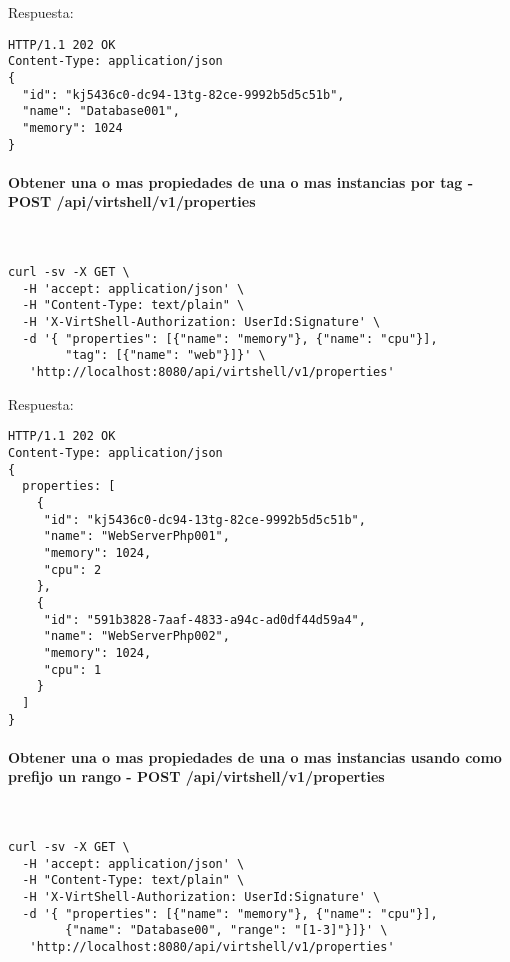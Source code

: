 \vspace{1cm}
Respuesta:
\vspace{1cm}

\begin{lstlisting}[style=json]
HTTP/1.1 202 OK
Content-Type: application/json
{
  "id": "kj5436c0-dc94-13tg-82ce-9992b5d5c51b",
  "name": "Database001",
  "memory": 1024
}
\end{lstlisting}

\paragraph{Obtener una o mas propiedades de una o mas instancias por tag - POST /api/virtshell/v1/properties} ~\\

\begin{lstlisting}[style=json]
curl -sv -X GET \
  -H 'accept: application/json' \
  -H "Content-Type: text/plain" \
  -H 'X-VirtShell-Authorization: UserId:Signature' \
  -d '{ "properties": [{"name": "memory"}, {"name": "cpu"}],
        "tag": [{"name": "web"}]}' \
   'http://localhost:8080/api/virtshell/v1/properties'
\end{lstlisting}

\vspace{1cm}
Respuesta:
\vspace{1cm}

\begin{lstlisting}[style=json]
HTTP/1.1 202 OK
Content-Type: application/json
{
  properties: [
    {
     "id": "kj5436c0-dc94-13tg-82ce-9992b5d5c51b",
     "name": "WebServerPhp001",
     "memory": 1024,
     "cpu": 2
    },
    {
     "id": "591b3828-7aaf-4833-a94c-ad0df44d59a4",
     "name": "WebServerPhp002",
     "memory": 1024,
     "cpu": 1  
    }
  ]
}
\end{lstlisting}

\paragraph{Obtener una o mas propiedades de una o mas instancias usando como prefijo un rango - POST /api/virtshell/v1/properties} ~\\

\begin{lstlisting}[style=json]
curl -sv -X GET \
  -H 'accept: application/json' \
  -H "Content-Type: text/plain" \
  -H 'X-VirtShell-Authorization: UserId:Signature' \
  -d '{ "properties": [{"name": "memory"}, {"name": "cpu"}],
        {"name": "Database00", "range": "[1-3]"}]}' \
   'http://localhost:8080/api/virtshell/v1/properties'
\end{lstlisting}

